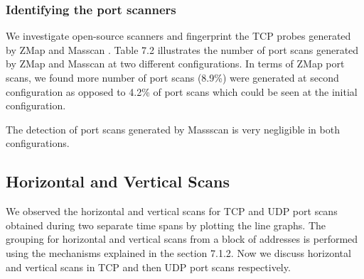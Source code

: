 \subsubsection{Identifying the port scanners}
 We investigate open-source scanners and fingerprint the TCP probes generated by ZMap \cite{durumeric2013zmap} and Masscan \cite{graham2014masscan}.
 Table 7.2 illustrates the number of port scans generated by ZMap and Masscan at two different configurations.
 In terms of ZMap port scans, we found more number of port scans (8.9\%) were generated at second configuration as opposed to 4.2\% of port scans which could be seen at the initial configuration.
 \begin{table}[t!]
    \centering
    \caption{Number of TCP port scans generated by two different port scanners}
\end{table}
The detection of port scans generated by Massscan is very negligible in both configurations.
\subsection{Horizontal and Vertical Scans}
We observed the horizontal and vertical scans for TCP and UDP port scans obtained during two separate time spans by plotting the line graphs.
The grouping for horizontal and vertical scans from a block of addresses is performed using the mechanisms explained in the section 7.1.2.
Now we discuss horizontal and vertical scans in TCP and then UDP port scans respectively.
